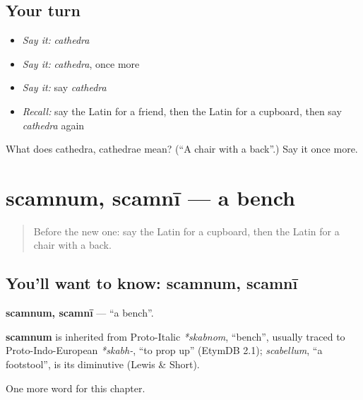 \subsection*{Your turn}
\begin{itemize}
\raggedright
  \item \emph{Say it:} \emph{cathedra}
  \item \emph{Say it:} \emph{cathedra}, once more
  \item \emph{Say it:} say \emph{cathedra}
  \item \emph{Recall:} say the Latin for a friend, then the Latin for a cupboard, then say \emph{cathedra} again
\end{itemize}

\begin{tcolorbox}[breakable,colback=teal!4,colframe=teal!35!black,title={Before you move on}]
What does cathedra, cathedrae mean? (\textquotedblleft{}A chair with a back\textquotedblright{}.) Say it once more.
\end{tcolorbox}
\section[scamnum, scamnī]{scamnum, scamnī — a bench}

\label{lesson:LA-C139-scamnum}



\begin{quote}
Before the new one: say the Latin for a cupboard, then the Latin for a chair with a back.
\end{quote}

\subsection*{You'll want to know: scamnum, scamnī}
\textbf{scamnum, scamnī} — \textquotedblleft{}a bench\textquotedblright{}.

\begin{cousinweb}
\textbf{scamnum} is inherited from Proto-Italic \emph{*skabnom}, \textquotedblleft{}bench\textquotedblright{}, usually traced to Proto-Indo-European \emph{*skabh-}, \textquotedblleft{}to prop up\textquotedblright{} (EtymDB 2.1); \emph{scabellum}, \textquotedblleft{}a footstool\textquotedblright{}, is its diminutive (Lewis \& Short).
\end{cousinweb}

\begin{grammarlens}[title={What you've built}]
One more word for this chapter.
\end{grammarlens}

